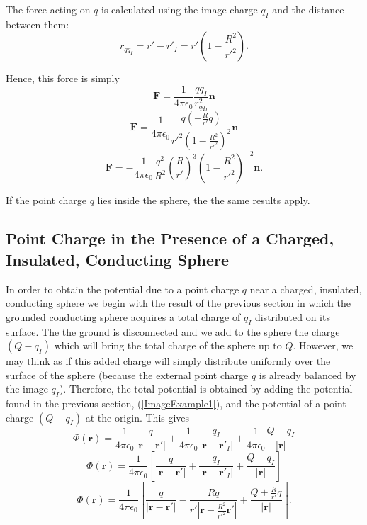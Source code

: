 The force acting on $q$ is calculated using the image charge $q_I$ and the distance between them: 
\begin{equation}
r_{qq_I} = r' - r'_I = r' \left( 1 - \frac{R^2}{r'^2}\right).
\end{equation}

Hence, this force is simply
\begin{equation}
\textbf{F} = \frac{1}{4\pi \epsilon_0} \frac{qq_I}{r_{qq_I}^2} \textbf{n}
\end{equation}
\begin{equation}
\textbf{F} = \frac{1}{4\pi \epsilon_0} \frac{q \left( -\frac{R}{r'} q \right)}{r'^2 \left( 1 - \frac{R^2}{r'^2}\right)^2} \textbf{n}
\end{equation}
\begin{equation}
\textbf{F} = - \frac{1}{4\pi \epsilon_0} \frac{q^2}{R^2}  \left( \frac{R}{r'}  \right)^3 \left( 1 - \frac{R^2}{r'^2}\right)^{-2} \textbf{n}.\label{ForceImage1}
\end{equation}

If the point charge $q$ lies inside the sphere, the the same results apply.

\subsection{ Point Charge in the Presence of a Charged, Insulated, Conducting Sphere}

In order to obtain the potential due to a point charge $q$ near a charged, insulated, conducting sphere we begin with the result of the previous section in which the grounded conducting sphere acquires a total charge of $q_I$ distributed on its surface. The the ground is disconnected and we add to the sphere the charge $(Q-q_I)$ which will bring the total charge of the sphere up to $Q$. However, we may think as if this added charge will simply distribute uniformly over the surface of the sphere (because the external point charge $q$ is already balanced by the image $q_I$). Therefore,  the total potential is obtained by adding the potential found in the previous section, (\ref{ImageExample1}), and the potential of a point charge $(Q-q_I)$ at the origin. This gives
\begin{equation}
\Phi (\textbf{r}) = \frac{1}{4\pi \epsilon_0} \frac{q}{\left| \textbf{r} - \textbf{r}' \right|} + \frac{1}{4\pi \epsilon_0} \frac{q_I}{\left| \textbf{r} - \textbf{r}'_I \right|} +  \frac{1}{4\pi \epsilon_0} \frac{Q-q_I}{\left| \textbf{r} \right|} \label{ChargedSpherePotential}
\end{equation}
\begin{equation}
\Phi (\textbf{r}) = \frac{1}{4\pi \epsilon_0} \left[ \frac{q}{\left| \textbf{r} - \textbf{r}' \right|} +  \frac{q_I}{\left| \textbf{r} - \textbf{r}'_I \right|} +   \frac{Q-q_I}{\left| \textbf{r} \right|} \right]
\end{equation}
\begin{equation}
\Phi (\textbf{r}) = \frac{1}{4\pi \epsilon_0} \left[ \frac{q}{\left| \textbf{r} - \textbf{r}' \right|} -  \frac{R q}{r' \left| \textbf{r} - \frac{R^2}{r'^2}\textbf{r}' \right|} +   \frac{Q+\frac{R}{r'}q}{\left| \textbf{r} \right|} \right].
\end{equation}


